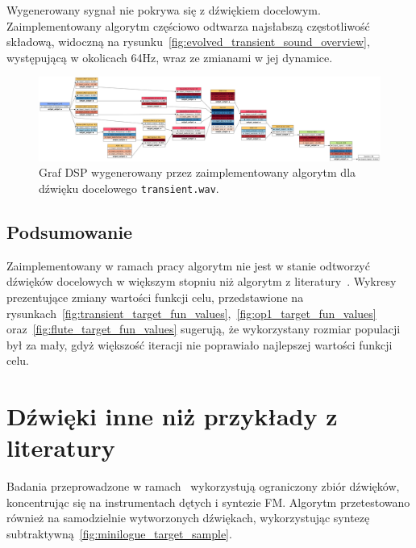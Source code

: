 Wygenerowany sygnał nie pokrywa się z dźwiękiem docelowym. Zaimplementowany
algorytm częściowo odtwarza najsłabszą częstotliwość składową, widoczną
na rysunku~\ref{fig:evolved_transient_sound_overview}, występującą
w okolicach 64Hz, wraz ze zmianami w jej dynamice.

\begin{figure}[H]
    \centering
    \includegraphics[angle=90,width=0.35\linewidth]{rys06/evolved_graph_transient.png}
    \caption{
      Graf DSP wygenerowany przez zaimplementowany algorytm
      dla dźwięku docelowego \texttt{transient.wav}.
    }\label{fig:evolved_graph_transient}
\end{figure}

\subsection{Podsumowanie}

Zaimplementowany w ramach pracy algorytm nie jest w stanie odtworzyć dźwięków
docelowych w większym stopniu niż algorytm z literatury~\cite{evolutionary_puredata}.
Wykresy prezentujące zmiany wartości funkcji celu, przedstawione na
rysunkach~\ref{fig:transient_target_fun_values},~\ref{fig:op1_target_fun_values}
oraz~\ref{fig:flute_target_fun_values} sugerują, że wykorzystany
rozmiar populacji był za mały, gdyż większość iteracji nie poprawiało
najlepszej wartości funkcji celu.

\section{Dźwięki inne niż przykłady z literatury}\label{sec:non_literature_samples}

Badania przeprowadzone w ramach~\cite{evolutionary_puredata}
wykorzystują ograniczony zbiór dźwięków, koncentrując
się na instrumentach dętych i syntezie FM\@. Algorytm przetestowano
również na samodzielnie wytworzonych dźwiękach, wykorzystując syntezę
subtraktywną~\ref{fig:minilogue_target_sample}.

